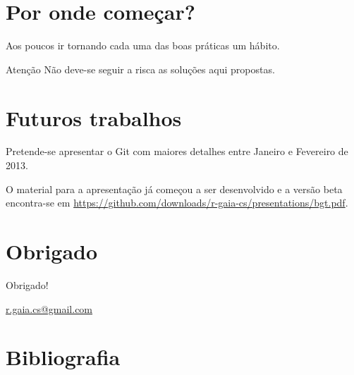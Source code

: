 \documentclass[11pt]{beamer}
\begin{document}
\section{Por onde começar?}
\begin{frame}
    Aos poucos ir tornando cada uma das boas práticas um hábito.
    \begin{block}{Atenção}
        Não deve-se seguir a risca as soluções aqui propostas.
    \end{block}
\end{frame}

\section{Futuros trabalhos}
\begin{frame}
    Pretende-se apresentar o Git com maiores detalhes entre Janeiro e Fevereiro
    de 2013.

    O material para a apresentação já começou a ser desenvolvido e a versão
    beta encontra-se em
    \url{https://github.com/downloads/r-gaia-cs/presentations/bgt.pdf}.
\end{frame}

\section*{Obrigado}
\begin{frame}
    \begin{center}
        Obrigado!
    \end{center}
    \begin{center}
        \url{r.gaia.cs@gmail.com}
    \end{center}
\end{frame}

\section*{Bibliografia}
\begin{frame}
    
    
\end{frame}
\end{document}

